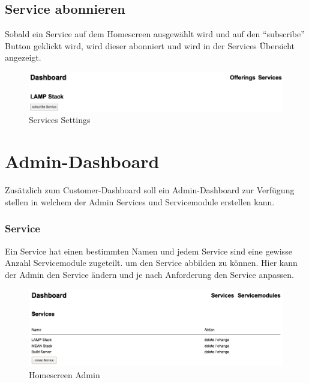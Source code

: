 \subsection{Service abonnieren}
Sobald ein Service auf dem Homescreen ausgewählt wird und auf den ``subscribe'' 
Button geklickt wird, wird dieser abonniert und wird in der Services Übersicht 
angezeigt.
\newline

\begin{figure}[!htbp]
\includegraphics[width=\textwidth]{./04_Anforderungen/images/service_settings}
\caption{Services Settings}
\end{figure}

\newpage
\section{Admin-Dashboard}
Zusätzlich zum Customer-Dashboard soll ein Admin-Dashboard zur Verfügung stellen 
in welchem der Admin Services und Servicemodule erstellen kann.

\subsubsection{Service}
Ein Service hat einen bestimmten Namen und jedem Service sind eine gewisse 
Anzahl Servicemodule zugeteilt. um den Service abbilden zu können.
Hier kann der Admin den Service ändern und je nach Anforderung den Service 
anpassen.
\newline
\begin{figure}[!htbp]
\includegraphics[width=\textwidth]{./04_Anforderungen/images/homescreen_admin}
\caption{Homescreen Admin}
\end{figure}